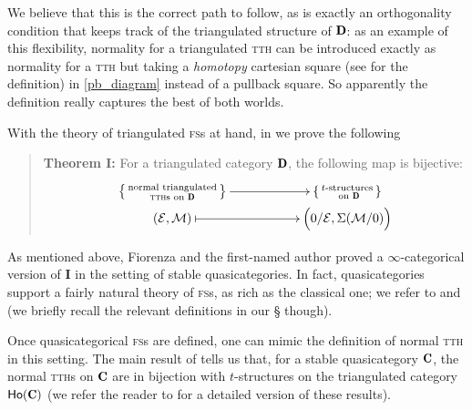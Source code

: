 We believe that this is the correct path to follow, as \adef{} is exactly an orthogonality condition that keeps track of the triangulated structure of $\cD$: as an example of this flexibility, normality for a triangulated \textsc{tth} can be introduced exactly as normality for a \textsc{tth} but taking a \emph{homotopy} cartesian square (see  for the definition) in \eqref{pb_diagram} instead of a pullback square. So apparently the definition really captures the best of both worlds.

With the theory of triangulated \textsc{fs}s at hand, in  we prove the following
\begin{quote}
\textbf{Theorem I:} For a triangulated category $\cD$, the following map is bijective:
\[
\xymatrix@R=0pt{
\left\{
{\begin{smallmatrix}
\text{normal triangulated}\\
\text{\textsc{tth}s on }\cD
\end{smallmatrix}}
\right\}
\ar[rr]&&
\left\{
{\begin{smallmatrix}
\text{$t$-structures}\\
\text{ on }\cD
\end{smallmatrix}}
\right\}\\
(\E,\M) \ar@{|->}[rr]&& \Big(0/\E, \Sigma(\M/0)\Big) 
}
\]
\end{quote}
As mentioned above, Fiorenza and the first-named author \cite{Fiorenza2014} proved a $\infty$\hyp{}categorical version of \athm\textbf{I} in the setting of stable quasicategories. In fact, quasicategories support a fairly natural theory of \textsc{fs}s, as rich as the classical one; we refer to \cite{joyal2008notes} and \cite{HTT} (we briefly recall the relevant definitions in our § though). 

Once quasicategorical \textsc{fs}s are defined, one can mimic the definition of normal \textsc{tth} in this setting. The main result of \cite{Fiorenza2014} tells us that, for a stable quasicategory $\C$, the normal \textsc{tth}s on $\C$ are in bijection with $t$-structures on the triangulated category $\ho(\C)$ (we refer the reader to \cite{tstructures} for a detailed version of these results). 

